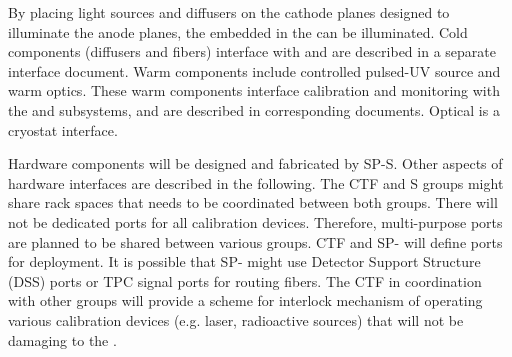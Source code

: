 By placing light sources and diffusers on the cathode planes designed to illuminate the anode planes, the  embedded in the  can be illuminated. Cold components (diffusers and fibers) interface with  and are described in a separate interface document.  Warm components include controlled pulsed-UV source and warm optics. These warm components interface calibration and monitoring  with the  and  subsystems, and are described in corresponding documents.  Optical \fdth is a cryostat interface. 

Hardware components will be designed and fabricated by SP-S. Other aspects of hardware interfaces are described in the following. The CTF and S groups might share rack spaces that needs to be coordinated between both groups. There will not be dedicated ports for all calibration devices. Therefore, multi-purpose ports are planned to be shared between various groups. CTF and SP- will define ports for deployment. It is possible that SP- might use Detector Support Structure (DSS) ports or TPC signal ports for routing fibers. The CTF in coordination with other groups will provide a scheme for interlock mechanism of operating various calibration devices (e.g. laser, radioactive sources) that will not be damaging to the . 








